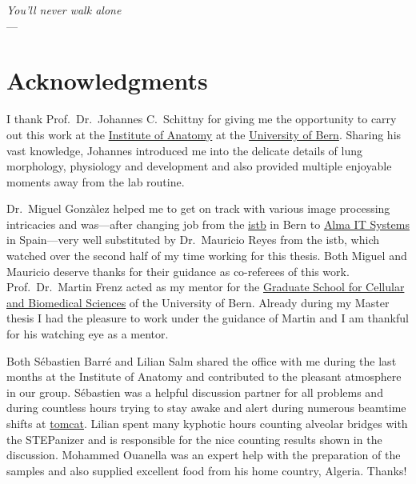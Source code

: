 \acresetall
{}
\begin{flushright}{\slshape You'll never walk alone} \\ \medskip
	---  \citep{Cash}
\end{flushright}
\vspace{6cm}
\begingroup
\let\clearpage\relax
\let\cleardoublepage\relax
\let\cleardoublepage\relax
\chapter*{Acknowledgments}
I thank Prof.\ Dr.\ Johannes C.\ Schittny for giving me the opportunity to carry out this work at the \href{http://www.ana.unibe.ch/}{Institute of Anatomy} at the \href{http://unibe.ch/}{University of Bern}. Sharing his vast knowledge, Johannes introduced me into the delicate details of lung morphology, physiology and development and also provided multiple enjoyable moments away from the lab routine.

Dr.\ Miguel Gonzàlez helped me to get on track with various image processing intricacies and was---after changing job from the \href{http://www.istb.unibe.ch/}{\ac{istb}} in Bern to \href{http://www.alma3d.com/}{Alma IT Systems} in Spain---very well substituted by Dr.\ Mauricio Reyes from the \ac{istb}, which watched over the second half of my time working for this thesis. Both Miguel and Mauricio deserve thanks for their guidance as co-referees of this work. Prof.\ Dr.\ Martin Frenz acted as my mentor for the \href{http://www.gcb.unibe.ch/}{Graduate School for Cellular and Biomedical Sciences} of the University of Bern. Already during my Master thesis I had the pleasure to work under the guidance of  Martin and I am thankful for his watching eye as a mentor.

Both Sébastien Barré and Lilian Salm shared the office with me during the last months at the Institute of Anatomy and contributed to the pleasant atmosphere in our group. Sébastien was a helpful discussion partner for all  problems and during countless hours trying to stay awake and alert during numerous beamtime shifts at \href{http://sls.web.psi.ch/view.php/beamlines/tomcat/}{\acs{tomcat}}. Lilian spent many kyphotic hours counting alveolar bridges with the STEPanizer and is responsible for the nice counting results shown in the discussion. Mohammed Ouanella was an expert help with the preparation of the samples and also supplied excellent food from his home country, Algeria. Thanks!

